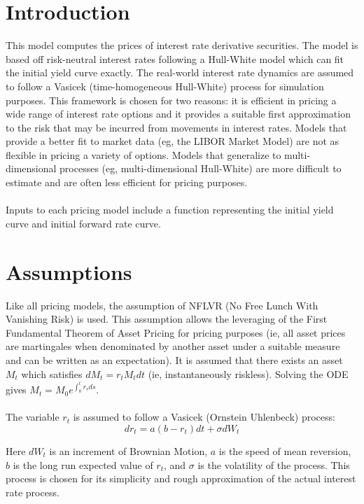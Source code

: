 \documentclass{article}
\theoremstyle{definition}
\begin{document}
\section{Introduction}

This model computes the prices of interest rate derivative securities.  The model is based off risk-neutral interest rates following a Hull-White model which can fit the initial yield curve exactly.  The real-world interest rate dynamics are assumed to follow a Vasicek (time-homogeneous Hull-White) process for simulation purposes.  This framework is chosen for two reasons: it is efficient in pricing a wide range of interest rate options and it provides a suitable first approximation to the risk that may be incurred from movements in interest rates.  Models that provide a better fit to market data (eg, the LIBOR Market Model) are not as flexible in pricing a variety of options.  Models that generalize to multi-dimensional processes (eg, multi-dimensional Hull-White) are more difficult to estimate and are often less efficient for pricing purposes.
\\
\\
Inputs to each pricing model include a function representing the initial yield curve and initial forward rate curve.

\section{Assumptions}

Like all pricing models, the assumption of NFLVR (No Free Lunch With Vanishing Risk) is used.  This assumption allows the leveraging of the First Fundamental Theorem of Asset Pricing for pricing purposes (ie, all asset prices are martingales when denominated by another asset under a suitable measure and can be written as an expectation).  It is assumed that there exists an asset \(M_t\) which satisfies \(dM_t=r_t M_t dt\) (ie, instantaneously riskless). Solving the ODE gives \(M_t=M_0 e^{\int_0 ^ t r_s ds}\).
\\
\\
The variable \(r_t\) is assumed to follow a Vasicek (Ornstein Uhlenbeck) process:
\[dr_t=a(b-r_t)dt+\sigma dW_t\]

Here \(dW_t\) is an increment of Brownian Motion, \(a\) is the speed of mean reversion, \(b\) is the long run expected value of \(r_t\), and \(\sigma\) is the volatility of the process. This process is chosen for its simplicity and rough approximation of the actual interest rate process.
\\
\\
\end{document}
